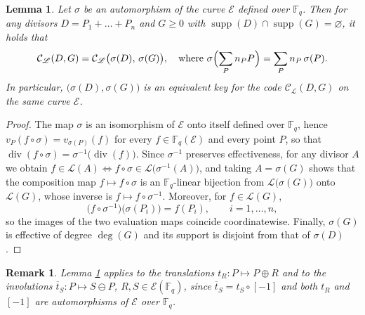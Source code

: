 \documentclass[sn-mathphys-num]{sn-jnl_modified}
\newcommand{\FF}{\ensuremath{\mathbb{F}}}
\newtheorem{lemma}[theorem]{Lemma}
\newtheorem{remark}{Remark}
\begin{document}
\begin{lemma}\label{lem:translation}
Let $\sigma$ be an automorphism of the curve $\mathcal{E}$ defined over $\FF_q$. Then for any divisors $D = P_1 + \ldots + P_n$ and $G \geq 0$ with $\operatorname{supp}(D) \cap \operatorname{supp}(G) = \varnothing$, it holds that
\[
\mathcal{C}_\mathscr{L}(D, G) = \mathcal{C}_\mathscr{L}\bigl(\sigma(D),\, \sigma(G)\bigr), \quad \text{where }  \sigma\Bigl(\sum_P n_P P\Bigr) = \sum_P n_P\, \sigma(P).
\]
In particular, $\bigl(\sigma(D), \sigma(G)\bigr)$ is an equivalent key for the code $\mathcal{C}_\mathscr{L}(D, G)$ on the same curve $\mathcal{E}$.
\end{lemma}
\begin{proof}
The map $\sigma$ is an isomorphism of $\mathcal{E}$ onto itself defined over $\FF_q$, hence $v_P(f \circ \sigma) = v_{\sigma(P)}(f)$ for every $f \in \FF_q(\mathcal{E})$ and every point $P$, so that $\operatorname{div}(f \circ \sigma) = \sigma^{-1}\bigl(\operatorname{div}(f)\bigr)$. Since $\sigma^{-1}$ preserves effectiveness, for any divisor $A$ we obtain $f \in \mathscr{L}(A) \iff f \circ \sigma \in \mathscr{L}\bigl(\sigma^{-1}(A)\bigr)$, and taking $A = \sigma(G)$ shows that the composition map $f \mapsto f \circ \sigma$ is an $\FF_q$-linear bijection from $\mathscr{L}\bigl(\sigma(G)\bigr)$ onto $\mathscr{L}(G)$, whose inverse is $f \mapsto f \circ \sigma^{-1}$. Moreover, for $f \in \mathscr{L}(G)$,
\[
\bigl(f \circ \sigma^{-1}\bigr)\bigl(\sigma(P_i)\bigr) = f(P_i), \qquad i = 1, \dots, n,
\]
so the images of the two evaluation maps coincide coordinatewise. Finally, $\sigma(G)$ is effective of degree $\deg(G)$ and its support is disjoint from that of $\sigma(D)$.
\end{proof}


\begin{remark}
Lemma \ref{lem:translation} applies to the translations $t_R : P \mapsto P \oplus R$ and to the involutions $\overline{t}_S : P \mapsto S \ominus P$, $R, S \in \mathcal{E}(\FF_q)$, since $\overline{t}_S = t_S \circ [-1]$ and both $t_R$ and $[-1]$ are automorphisms of $\mathcal{E}$ over $\FF_q$.
\end{remark}
\end{document}
